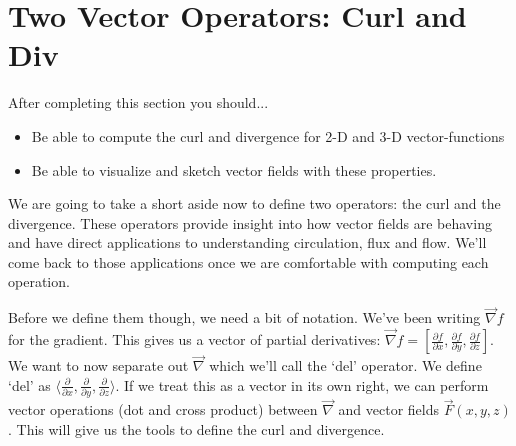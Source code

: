 \documentclass[10pt,]{book}
\theoremstyle{plain}
\theoremstyle{definition}
\theoremstyle{definition}
\theoremstyle{definition}
\theoremstyle{definition}
\theoremstyle{definition}
\numberwithin{equation}{section}
\begin{document}
\section[{Two Vector Operators: Curl and Div}]{Two Vector Operators: Curl and Div}\label{section-43}
After completing this section you should... \leavevmode%
\begin{itemize}[label=\textbullet]
\item{}Be able to compute the curl and divergence for 2-D and 3-D vector-functions%
\item{}Be able to visualize and sketch vector fields with these properties.%
\end{itemize}
%
\par
We are going to take a short aside now to define two operators: the curl and the divergence. These operators provide insight into how vector fields are behaving and have direct applications to understanding circulation, flux and flow. We'll come back to those applications once we are comfortable with computing each operation.%
\par
Before we define them though, we need a bit of notation. We've been writing \(\vec \nabla f\) for the gradient. This gives us a vector of partial derivatives: \(\vec \nabla f= \left[ \frac{\partial f}{\partial x},\frac{\partial f}{\partial y},\frac{\partial f}{\partial z}\right]\). We want to now separate out \(\vec \nabla\) which we'll call the `del' operator. We define `del' as \(\langle \frac{\partial}{\partial x},\frac{\partial}{\partial y},\frac{\partial}{\partial z}\rangle\). If we treat this as a vector in its own right, we can perform vector operations (dot and cross product) between \(\vec \nabla\) and vector fields \(\vec{F}(x,y,z)\). This will give us the tools to define the curl and divergence.%
\typeout{************************************************}
\typeout{************************************************}
\end{document}
